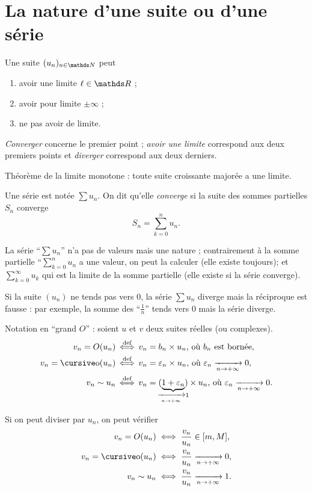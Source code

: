 \section{La nature d'une suite ou d'une série}

\begin{met}
	Une suite $(u_n)_{n\in\N}$\/ peut
	\begin{enumerate}
		\item avoir une limite $\ell \in \R$\/ ;
		\item avoir pour limite $\pm \infty$\/ ;
		\item ne pas avoir de limite.
	\end{enumerate}

	{\it Converger}\/ concerne le premier point ; {\it avoir une limite}\/ correspond aux deux premiers points et {\it diverger}\/ correspond aux deux derniers.
\end{met}

Théorème de la limite monotone : toute suite croissante majorée a une limite.

Une série est notée $\sum u_n$. On dit qu'elle {\it converge}\/ si la suite des sommes partielles $S_n$\/ converge \[
	S_n = \sum_{k=0}^{n} u_n
.\]

La série ``$\sum u_n$\/'' n'a pas de valeurs mais une nature ; contrairement à la somme partielle ``$\sum_{k=0}^{n} u_n$\/ a une valeur, on peut la calculer (elle existe toujours); et $\sum_{k=0}^{\infty} u_k$\/ qui est la limite de la somme partielle (elle existe si la série converge).

Si la suite $(u_n)$\/ ne tends pas vers $0$, la série $\sum u_n$\/ diverge mais la réciproque est fausse : par exemple, la somme des ``$\frac{1}{n}$\/'' tends vers 0 mais la série diverge.

\begin{rap} %
	Notation en ``grand $O$\/'' : soient $u$\/ et $v$\/ deux suites réelles (ou complexes).
	\begin{align*}
		v_n = O(u_n) &\mathop{\iff}^{\text{def}} v_n = b_n \times u_n\text{, où $b_n$\/ est bornée},\\
		v_n = \po(u_n) &\mathop{\iff}^{\text{def}} v_n = \varepsilon_n \times u_n\text{, où $\varepsilon_n \tendsto{n \to +\infty} 0$},\\
		v_n \sim u_n &\mathop{\iff}^{\text{def}} v_n = (\underbrace{1 + \varepsilon_n}_{\mathclap{\tendsto{n\to +\infty} 1}}) \times u_n\text{, où $\varepsilon_n \tendsto{n \to +\infty} 0$}.\\
	\end{align*}

	Si on peut diviser par $u_n$, on peut vérifier
	\begin{align*}
		v_n = O(u_n) &\iff \frac{v_n}{u_n} \in [m, M],\\
		v_n = \po(u_n) &\iff \frac{v_n}{u_n} \tendsto{n\to +\infty} 0,\\
		v_n \sim u_n &\iff \frac{v_n}{u_n} \tendsto{n\to +\infty} 1.
	\end{align*}
\end{rap}

